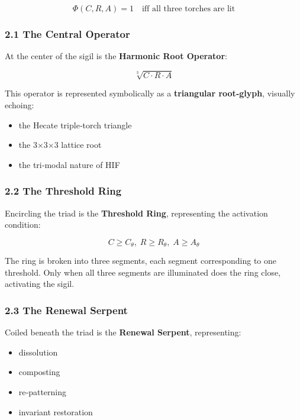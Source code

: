 \[
\Phi(C,R,A) = 1 \quad \text{iff all three torches are lit}
\]

\subsubsection{2.1 The Central Operator}\label{the-central-operator}

At the center of the sigil is the \textbf{Harmonic Root Operator}:

\[
\sqrt[3]{C \cdot R \cdot A}
\]

This operator is represented symbolically as a \textbf{triangular root‑glyph}, visually echoing:

\begin{itemize}
\tightlist
\item
  the Hecate triple‑torch triangle\\
\item
  the 3×3×3 lattice root\\
\item
  the tri‑modal nature of HIF
\end{itemize}

\subsubsection{2.2 The Threshold Ring}\label{the-threshold-ring}

Encircling the triad is the \textbf{Threshold Ring}, representing the activation condition:

\[
C \ge C_{\theta},\; R \ge R_{\theta},\; A \ge A_{\theta}
\]

The ring is broken into three segments, each segment corresponding to one threshold. Only when all three segments are illuminated does the ring close, activating the sigil.

\subsubsection{2.3 The Renewal Serpent}\label{the-renewal-serpent}

Coiled beneath the triad is the \textbf{Renewal Serpent}, representing:

\begin{itemize}
\tightlist
\item
  dissolution\\
\item
  composting\\
\item
  re‑patterning\\
\item
  invariant restoration
\end{itemize}

